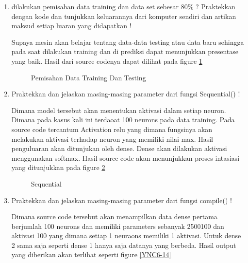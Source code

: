 \begin{enumerate}
\item dilakukan pemisahan data training dan data set sebesar 80\% ? Praktekkan dengan kode dan tunjukkan keluarannya dari komputer sendiri dan artikan maksud setiap luaran yang didapatkan !
	
	\subitem Supaya mesin akan belajar tentang data-data testing atau data baru sehingga pada saat dilakukan training dan di prediksi dapat menunjukkan presentase yang baik. Hasil dari source codenya dapat dilihat pada figure \ref{YNC6-12}

	\begin{figure}[!htbp]
		\caption{Pemisahan Data Training Dan Testing}
		\label{YNC6-12}
	\end{figure} 

\item Praktekkan dan jelaskan masing-masing parameter dari fungsi Sequential() !
	
	\subitem Dimana model tersebut akan menentukan aktivasi dalam setiap neuron. Dimana pada kasus kali ini terdaoat 100 neurons pada data training. Pada source code tercantum Activation relu yang dimana fungsinya akan melakukan aktivasi terhadap neuron yang memiliki nilai max. Hasil penguluaran akan ditunjukan oleh dense. Dense akan dilakukan aktivasi menggunakan softmax. Hasil source code akan menunjukkan proses intasiasi yang ditunjukkan pada figure \ref{YNC6-13}

	\begin{figure}[!htbp]
		\caption{Sequential}
		\label{YNC6-13}
	\end{figure} 	

\item Praktekkan dan jelaskan masing-masing parameter dari fungsi compile() !
	
	\subitem Dimana source code tersebut akan menampilkan data dense pertama berjumlah 100 neurons dan memiliki parameters sebanyak 2500100 dan aktivasi 100 yang dimana setiap 1 neuraons memiliki 1 aktivasi. Untuk dense 2 sama saja seperti dense 1 hanya saja datanya yang berbeda. Hasil output yang diberikan akan terlihat seperti figure \ref{YNC6-14}


\end{enumerate}
